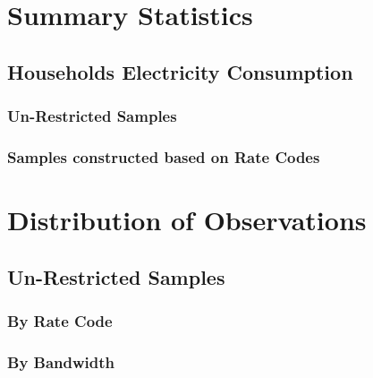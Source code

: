 \clearpage
\section{Summary Statistics}
\subsection{Households Electricity Consumption}

\subsubsection{Un-Restricted Samples}
\vspace{0.3cm}

\vspace{1.0cm}



\clearpage
\subsubsection{Samples constructed based on Rate Codes}
\vspace{0.3cm}

\vspace{1.0cm}


\clearpage


\clearpage


\clearpage



\clearpage
\section{Distribution of Observations}

\subsection{Un-Restricted Samples}
\subsubsection{By Rate Code}
\vspace{0.3cm}



\clearpage
\subsubsection{By Bandwidth}
\vspace{0.3cm}


